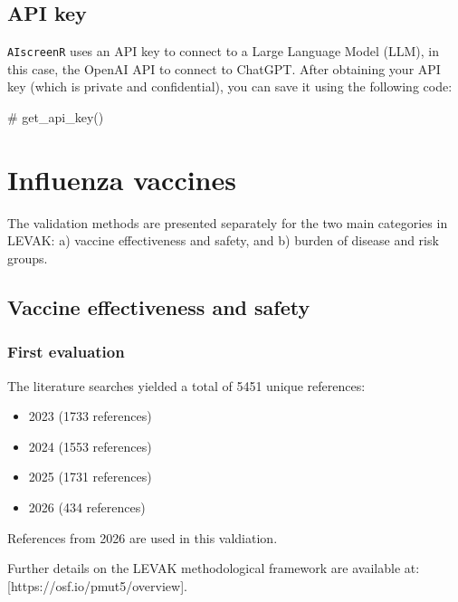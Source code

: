 \documentclass[
  letterpaper,
  DIV=11,
  numbers=noendperiod]{scrartcl}
\newenvironment{Shaded}{\begin{snugshade}}{\end{snugshade}}
\newcommand{\CommentTok}[1]{\textcolor[rgb]{0.37,0.37,0.37}{#1}}
\providecommand{\tightlist}{%
  \setlength{\itemsep}{0pt}\setlength{\parskip}{0pt}}
\begin{document}
\subsection{API key}\label{api-key}

\texttt{AIscreenR} uses an API key to connect to a Large Language Model
(LLM), in this case, the OpenAI API to connect to ChatGPT. After
obtaining your API key (which is private and confidential), you can save
it using the following code:

\begin{Shaded}
\begin{Highlighting}[]
\CommentTok{\# get\_api\_key() }
\end{Highlighting}
\end{Shaded}

\section{Influenza vaccines}\label{influenza-vaccines}

The validation methods are presented separately for the two main
categories in LEVAK: a) vaccine effectiveness and safety, and b) burden
of disease and risk groups.

\subsection{Vaccine effectiveness and
safety}\label{vaccine-effectiveness-and-safety}

\subsubsection{First evaluation}\label{first-evaluation}

The literature searches yielded a total of 5451 unique references:

\begin{itemize}
\tightlist
\item
  2023 (1733 references)
\item
  2024 (1553 references)
\item
  2025 (1731 references)
\item
  2026 (434 references)
\end{itemize}

References from 2026 are used in this valdiation.

Further details on the LEVAK methodological framework are available at:
{[}https://osf.io/pmut5/overview{]}.
\end{document}
